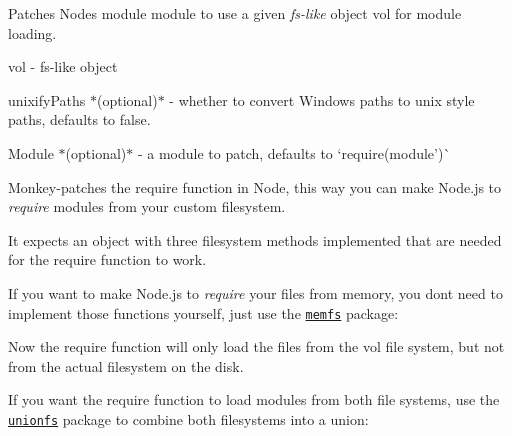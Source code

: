 Patches Node\textquotesingle{}s {\ttfamily module} module to use a given {\itshape fs-\/like} object {\ttfamily vol} for module loading.


\begin{DoxyItemize}
\item {\ttfamily vol} -\/ fs-\/like object
\item {\ttfamily unixify\+Paths} $\ast$(optional)$\ast$ -\/ whether to convert Windows paths to unix style paths, defaults to {\ttfamily false}.
\item {\ttfamily Module} $\ast$(optional)$\ast$ -\/ a module to patch, defaults to `require(\textquotesingle{}module')\`{}
\end{DoxyItemize}

Monkey-\/patches the {\ttfamily require} function in Node, this way you can make Node.\+js to {\itshape require} modules from your custom filesystem.

It expects an object with three filesystem methods implemented that are needed for the {\ttfamily require} function to work.


\begin{DoxyCode}{0}
\DoxyCodeLine{\};}

\end{DoxyCode}


If you want to make Node.\+js to {\itshape require} your files from memory, you don\textquotesingle{}t need to implement those functions yourself, just use the \href{https://github.com/streamich/memfs}{\texttt{ {\ttfamily memfs}}} package\+:


\begin{DoxyCode}{0}
\DoxyCodeLine{}

\end{DoxyCode}


Now the {\ttfamily require} function will only load the files from the {\ttfamily vol} file system, but not from the actual filesystem on the disk.

If you want the {\ttfamily require} function to load modules from both file systems, use the \href{https://github.com/streamich/unionfs}{\texttt{ {\ttfamily unionfs}}} package to combine both filesystems into a union\+:


\begin{DoxyCode}{0}
\DoxyCodeLine{}

\end{DoxyCode}
 